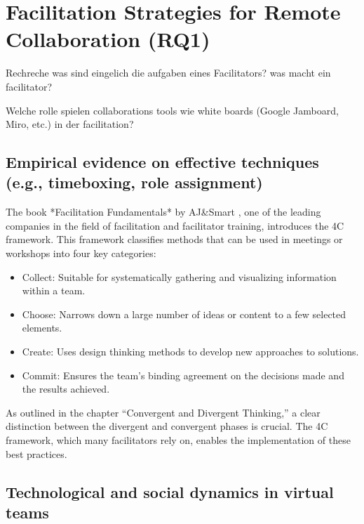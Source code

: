\section{Facilitation Strategies for Remote Collaboration (RQ1)}

\label{sec:facilitation}

Rechreche was sind eingelich die aufgaben eines Facilitators? was macht ein facilitator?

Welche rolle spielen collaborations tools wie white boards (Google Jamboard, Miro, etc.) in der facilitation?

\subsection{Empirical evidence on effective techniques (e.g., timeboxing, role assignment)}
The book *Facilitation Fundamentals* by AJ\&Smart \cite{aj&smartFacilitationFundamentalsWorkbook}, one of the
leading companies in the field of facilitation and facilitator training, introduces the 4C framework. This framework
classifies methods that can be used in meetings or workshops into four key categories:

\begin{itemize}
  \item Collect: Suitable for systematically gathering and visualizing information within a team.
  \item Choose: Narrows down a large number of ideas or content to a few selected elements.
  \item Create: Uses design thinking methods to develop new approaches to solutions.
  \item Commit: Ensures the team’s binding agreement on the decisions made and the results achieved.
\end{itemize}

As outlined in the chapter “Convergent and Divergent Thinking,” a clear distinction between the divergent and
convergent phases is crucial. The 4C framework, which many facilitators rely on, enables
the implementation of these best practices.

\subsection{Technological and social dynamics in virtual teams}
